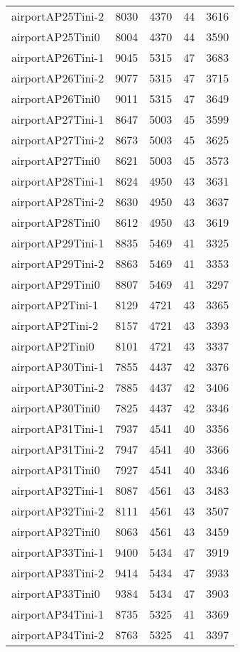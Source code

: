 \begin{longtable}{lrrrr}
airportAP25Tini-2 & 8030 & 4370 & 44 & 3616 \\
airportAP25Tini0 & 8004 & 4370 & 44 & 3590 \\
airportAP26Tini-1 & 9045 & 5315 & 47 & 3683 \\
airportAP26Tini-2 & 9077 & 5315 & 47 & 3715 \\
airportAP26Tini0 & 9011 & 5315 & 47 & 3649 \\
airportAP27Tini-1 & 8647 & 5003 & 45 & 3599 \\
airportAP27Tini-2 & 8673 & 5003 & 45 & 3625 \\
airportAP27Tini0 & 8621 & 5003 & 45 & 3573 \\
airportAP28Tini-1 & 8624 & 4950 & 43 & 3631 \\
airportAP28Tini-2 & 8630 & 4950 & 43 & 3637 \\
airportAP28Tini0 & 8612 & 4950 & 43 & 3619 \\
airportAP29Tini-1 & 8835 & 5469 & 41 & 3325 \\
airportAP29Tini-2 & 8863 & 5469 & 41 & 3353 \\
airportAP29Tini0 & 8807 & 5469 & 41 & 3297 \\
airportAP2Tini-1 & 8129 & 4721 & 43 & 3365 \\
airportAP2Tini-2 & 8157 & 4721 & 43 & 3393 \\
airportAP2Tini0 & 8101 & 4721 & 43 & 3337 \\
airportAP30Tini-1 & 7855 & 4437 & 42 & 3376 \\
airportAP30Tini-2 & 7885 & 4437 & 42 & 3406 \\
airportAP30Tini0 & 7825 & 4437 & 42 & 3346 \\
airportAP31Tini-1 & 7937 & 4541 & 40 & 3356 \\
airportAP31Tini-2 & 7947 & 4541 & 40 & 3366 \\
airportAP31Tini0 & 7927 & 4541 & 40 & 3346 \\
airportAP32Tini-1 & 8087 & 4561 & 43 & 3483 \\
airportAP32Tini-2 & 8111 & 4561 & 43 & 3507 \\
airportAP32Tini0 & 8063 & 4561 & 43 & 3459 \\
airportAP33Tini-1 & 9400 & 5434 & 47 & 3919 \\
airportAP33Tini-2 & 9414 & 5434 & 47 & 3933 \\
airportAP33Tini0 & 9384 & 5434 & 47 & 3903 \\
airportAP34Tini-1 & 8735 & 5325 & 41 & 3369 \\
airportAP34Tini-2 & 8763 & 5325 & 41 & 3397 \\

\end{longtable}
